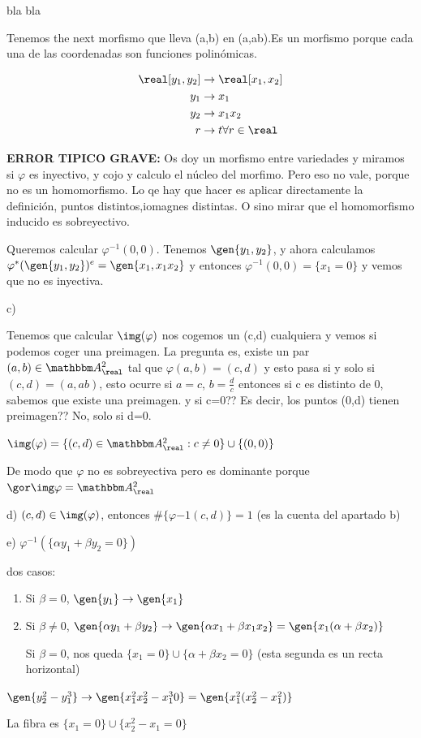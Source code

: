 \begin{problem}[7]

	bla bla

	\solution
	Tenemos the next morfismo que lleva (a,b) en (a,ab).Es un morfismo porque cada una de las coordenadas son funciones polinómicas.

	\begin{align*}
		\real[y_1, y_2] & \rightarrow \real[x_1,x_2] \\
		y_1 & \rightarrow x_1 \\
		y_2 & \rightarrow x_1x_2 \\
		r & \rightarrow t \forall r \in \real
	\end{align*}

	\textbf{ERROR TIPICO GRAVE:} Os doy un morfismo entre variedades y miramos si $\varphi$ es inyectivo, y cojo y calculo el  núcleo del morfimo. Pero eso no vale, porque no es un homomorfismo. Lo qe hay que hacer es aplicar directamente la definición, puntos distintos,iomagnes distintas. O sino mirar que el homomorfismo inducido es sobreyectivo.

	Queremos calcular $\varphi^{-1}(0,0)$. Tenemos $\gen{y_1, y_2}$, y ahora calculamos $\varphi^*(\gen{y_1, y_2})^e= \gen{x_1, x_1x_2}$ y entonces $\varphi^{-1}(0,0) = \{ x_1=0 \}$ y vemos que no es inyectiva.

	c)

	Tenemos que calcular $\img (\varphi)$ nos cogemos un (c,d) cualquiera y vemos si podemos coger una preimagen. La pregunta es, existe un par $(a,b) \in \A^2_{\real}$ tal que $\varphi(a,b)=(c,d)$ y esto pasa si y solo si $(c,d)=(a,ab)$, esto ocurre si $a=c$, $b=\frac{d}{c}$ entonces si c es distinto de 0, sabemos que existe una preimagen. y si c=0?? Es decir, los puntos (0,d) tienen preimagen?? No, solo si d=0.

	$\img(\varphi)= \{  (c,d) \in \A^2_{\real}: c\neq 0 \} \cup \{ (0,0) \}$

	De modo que $\varphi$ no es sobreyectiva pero es dominante porque $\cls{\img \varphi=\A^2_{\real}}$

	d) $(c,d) \in \img(\varphi)$, entonces $\#\{ \varphi{-1}(c,d) \}=1$ (es la cuenta del apartado b)

	e) $\varphi^{-1}(\{ \alpha y_1+ \beta y_2=0 \})$

	dos casos:
	\begin{enumerate}
		\item Si $\beta=0$, $\gen{y_1} \rightarrow \gen{x_1}$
		\item Si $\beta \neq 0$, $\gen{\alpha y_1+ \beta y_2} \rightarrow \gen{\alpha x_1+ \beta x_1x_2}=\gen{x_1(\alpha+\beta x_2)}$

		Si $\beta=0$, nos queda $\{ x_1=0 \} \cup \{ \alpha+ \beta x_2=0 \}$ (esta segunda es un recta horizontal)
	\end{enumerate}

	$\gen{y_2^2-y_1^3} \rightarrow \gen{x_1^2x_2^2-x_1^30} = \gen{x_1^2(x_2^2-x_1^2)}$

	La fibra es $\{ x_1=0 \} \cup \{ x_2^2-x_1=0 \}$
\end{problem}

